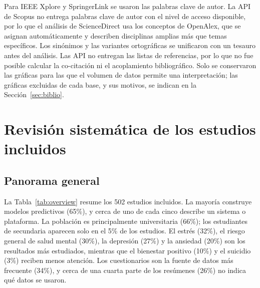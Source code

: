 \documentclass[11pt,a4paper]{article}
\begin{document}
Para IEEE Xplore y SpringerLink se usaron las palabras clave de autor. La API de Scopus no entrega palabras clave de autor con el nivel de acceso disponible, por lo que el análisis de ScienceDirect usa los conceptos de OpenAlex, que se asignan automáticamente y describen disciplinas amplias más que temas específicos. Los sinónimos y las variantes ortográficas se unificaron con un tesauro antes del análisis. Las API no entregan las listas de referencias, por lo que no fue posible calcular la co-citación ni el acoplamiento bibliográfico. Solo se conservaron las gráficas para las que el volumen de datos permite una interpretación; las gráficas excluidas de cada base, y sus motivos, se indican en la Sección~\ref{sec:biblio}.

\section{Revisión sistemática de los estudios incluidos}\label{sec:review}

\subsection{Panorama general}

La Tabla~\ref{tab:overview} resume los 502 estudios incluidos. La mayoría construye modelos predictivos (65\%), y cerca de uno de cada cinco describe un sistema o plataforma. La población es principalmente universitaria (66\%); los estudiantes de secundaria aparecen solo en el 5\% de los estudios. El estrés (32\%), el riesgo general de salud mental (30\%), la depresión (27\%) y la ansiedad (20\%) son los resultados más estudiados, mientras que el bienestar positivo (10\%) y el suicidio (3\%) reciben menos atención. Los cuestionarios son la fuente de datos más frecuente (34\%), y cerca de una cuarta parte de los resúmenes (26\%) no indica qué datos se usaron.
\end{document}

